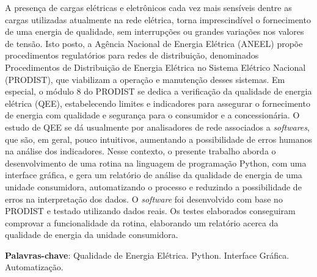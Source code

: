 \begin{resumo}[RESUMO]
  \begin{SingleSpacing}
    A presença de cargas elétricas e eletrônicos cada vez mais sensíveis dentre as cargas utilizadas atualmente na rede elétrica, torna imprescindível o fornecimento de uma energia de qualidade, sem interrupções ou grandes variações nos valores de tensão. Isto posto, a Agência Nacional de Energia Elétrica (ANEEL) propõe procedimentos regulatórios para redes de distribuição, denominados Procedimentos de Distribuição de Energia Elétrica no Sistema Elétrico Nacional (PRODIST), que viabilizam a operação e manutenção desses sistemas. Em especial, o módulo 8 do PRODIST se dedica a verificação da qualidade de energia elétrica (QEE), estabelecendo limites e indicadores para assegurar o fornecimento de energia com qualidade e segurança para o consumidor e a concessionária. O estudo de QEE se dá usualmente por analisadores de rede associados a \textit{softwares}, que são, em geral, pouco intuitivos, aumentando a possibilidade de erros humanos na análise dos indicadores. Nesse contexto, o presente trabalho aborda o desenvolvimento de uma rotina na linguagem de programação Python, com uma interface gráfica, e gera um relatório de análise da qualidade de energia de uma unidade consumidora, automatizando o processo e reduzindo a possibilidade de erros na interpretação dos dados. O \textit{software} foi desenvolvido com base no PRODIST e testado utilizando dados reais. Os testes elaborados conseguiram comprovar a funcionalidade da rotina, elaborando um relatório acerca da qualidade de energia da unidade consumidora.
  \end{SingleSpacing}

  \vspace{\onelineskip}
  \textbf{Palavras-chave}: Qualidade de Energia Elétrica. Python. Interface Gráfica. Automatização.
\end{resumo}